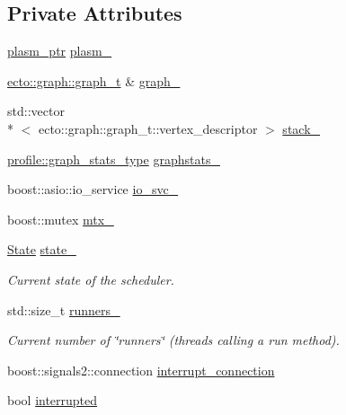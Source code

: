 \subsection*{Private Attributes}
\begin{DoxyCompactItemize}
\item 
\hyperlink{namespaceecto_a6b83be6cd685db71f03b14871653475f}{plasm\-\_\-ptr} \hyperlink{classecto_1_1scheduler_a9ccfb508a5bf75ec7ca69b475a7c7226}{plasm\-\_\-}
\item 
\hyperlink{structecto_1_1graph_1_1graph__t}{ecto\-::graph\-::graph\-\_\-t} \& \hyperlink{classecto_1_1scheduler_a79de9623f94d1003dc34f12fc69c5981}{graph\-\_\-}
\item 
std\-::vector\\*
$<$ ecto\-::graph\-::graph\-\_\-t\-::vertex\-\_\-descriptor $>$ \hyperlink{classecto_1_1scheduler_ad2b6561ebc08afd8cf8edaa39cb702b8}{stack\-\_\-}
\item 
\hyperlink{structecto_1_1profile_1_1graph__stats__type}{profile\-::graph\-\_\-stats\-\_\-type} \hyperlink{classecto_1_1scheduler_a6da29ce8fc4f4d2a1c451a577e049c62}{graphstats\-\_\-}
\item 
boost\-::asio\-::io\-\_\-service \hyperlink{classecto_1_1scheduler_af8f90a97a59811157c657cecb8512069}{io\-\_\-svc\-\_\-}
\item 
boost\-::mutex \hyperlink{classecto_1_1scheduler_a47a29f5a0e1f1ab8ce816b0c63442b5c}{mtx\-\_\-}
\item 
\hyperlink{classecto_1_1scheduler_a6b063d1c4bb9dad58d7ace61946b1200}{State} \hyperlink{classecto_1_1scheduler_a21d2aac4a8a2ef665942b7c9b741250c}{state\-\_\-}
\begin{DoxyCompactList}\small\item\em Current state of the scheduler. \end{DoxyCompactList}\item 
std\-::size\-\_\-t \hyperlink{classecto_1_1scheduler_a650d97445fe90ba4572d208430f71e20}{runners\-\_\-}
\begin{DoxyCompactList}\small\item\em Current number of \char`\"{}runners\char`\"{} (threads calling a run method). \end{DoxyCompactList}\item 
boost\-::signals2\-::connection \hyperlink{classecto_1_1scheduler_a7eedec3e00966ffa25a5172bdaa8b7c6}{interrupt\-\_\-connection}
\item 
bool \hyperlink{classecto_1_1scheduler_abbb89be5b75cc481087fc2b2b1f00147}{interrupted}
\end{DoxyCompactItemize}


